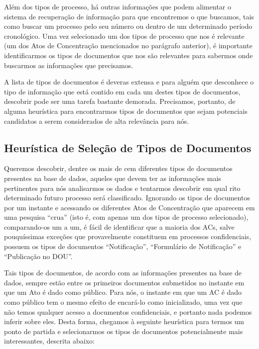 \documentclass[11pt]{report}
\newcommand{\quotes}[1]{``#1''}
\begin{document}
Além dos tipos de processo, há outras informações que podem alimentar o sistema de recuperação de informação para que encontremos o que buscamos, tais como buscar um processo pelo
seu número ou dentro de um determinado período cronológico. Uma vez selecionado um dos tipos de processo que nos é relevante (um dos Atos de Concentração mencionados no parágrafo
anterior), é importante identificarmos os tipos de documentos que nos são relevantes para sabermos onde buscarmos as informações que precisamos.

A lista de tipos de documentos é deveras extensa e para alguém que desconhece o tipo de informação que está contido em cada um destes tipos de documentos, descobrir pode ser uma tarefa
bastante demorada. Precisamos, portanto, de alguma heurística para encontrarmos tipos de documentos que sejam potenciais candidatos a serem considerados de alta relevância para nós.

\subsection{Heurística de Seleção de Tipos de Documentos}

\indent\indent Queremos descobrir, dentre os mais de cem diferentes tipos de documentos presentes na base de dados, aqueles que devem
ter as informações mais pertinentes para nós analisarmos os dados e tentarmos descobrir em qual rito determinado futuro processo será classificado.
Ignorando os tipos de documentos por um instante e acessando os diferentes Atos de Concentração que aparecem em uma pesquisa \quotes{crua} (isto é, com apenas um dos tipos de
processo selecionado), comparando-os um a um, é fácil de identificar que a maioria dos ACs, salve pouquíssimas exceções que provavelmente constituem em processos confidenciais,
possuem os tipos de documentos \quotes{Notificação}, \quotes{Formulário de Notificação} e \quotes{Publicação no DOU}.

Tais tipos de documentos, de acordo com as informações presentes na base de dados, sempre estão entre os primeiros documentos submetidos no instante em que um
Ato é dado como público. Para nós, o instante em que um AC é dado como público tem o mesmo efeito de encará-lo como inicializado, uma vez que não temos qualquer acesso
a documentos confidenciais, e portanto nada podemos inferir sobre eles.
Desta forma, chegamos à seguinte heurística para termos um ponto de partida e selecionarmos os tipos de documentos potencialmente mais interessantes, descrita abaixo:
\end{document}
